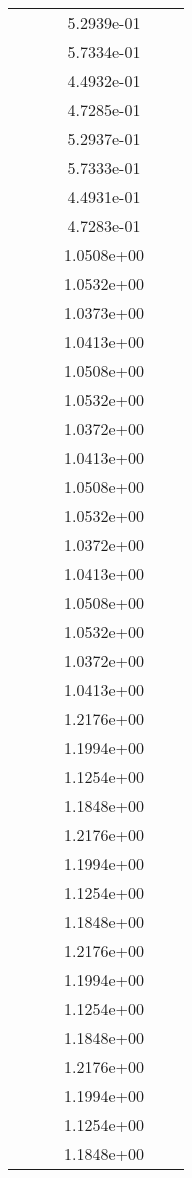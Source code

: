 \begin{xltabular}{\textwidth}{r|rS[table-format=1.3e+2]S[table-format=1.4e+2]S[table-format=1.4e+2]S[table-format=-1.5]}
&  &  & 5.2939e-01 & & \\
&  &  & 5.7334e-01 & & \\
&  &  & 4.4932e-01 & & \\
&  &  & 4.7285e-01 & & \\
&  &  & 5.2937e-01 & & \\
&  &  & 5.7333e-01 & & \\
&  &  & 4.4931e-01 & & \\
&  &  & 4.7283e-01 & & \\
&  &  & 1.0508e+00 & & \\
&  &  & 1.0532e+00 & & \\
&  &  & 1.0373e+00 & & \\
&  &  & 1.0413e+00 & & \\
&  &  & 1.0508e+00 & & \\
&  &  & 1.0532e+00 & & \\
&  &  & 1.0372e+00 & & \\
&  &  & 1.0413e+00 & & \\
&  &  & 1.0508e+00 & & \\
&  &  & 1.0532e+00 & & \\
&  &  & 1.0372e+00 & & \\
&  &  & 1.0413e+00 & & \\
&  &  & 1.0508e+00 & & \\
&  &  & 1.0532e+00 & & \\
&  &  & 1.0372e+00 & & \\
&  &  & 1.0413e+00 & & \\
&  &  & 1.2176e+00 & & \\
&  &  & 1.1994e+00 & & \\
&  &  & 1.1254e+00 & & \\
&  &  & 1.1848e+00 & & \\
&  &  & 1.2176e+00 & & \\
&  &  & 1.1994e+00 & & \\
&  &  & 1.1254e+00 & & \\
&  &  & 1.1848e+00 & & \\
&  &  & 1.2176e+00 & & \\
&  &  & 1.1994e+00 & & \\
&  &  & 1.1254e+00 & & \\
&  &  & 1.1848e+00 & & \\
&  &  & 1.2176e+00 & & \\
&  &  & 1.1994e+00 & & \\
&  &  & 1.1254e+00 & & \\
&  &  & 1.1848e+00 & & \\

\end{xltabular}

